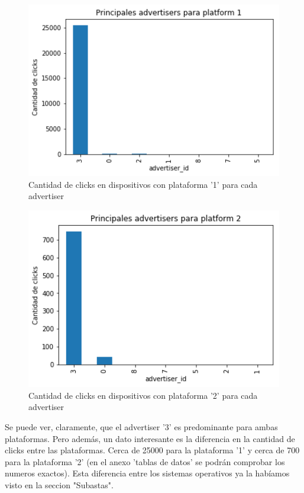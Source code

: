 \documentclass[a4paper, 12pt]{article}
\begin{document}
	\FloatBarrier
		\begin{figure}[h]
			\centering
			\includegraphics[width=350pt]{images/auctions-clicks/advporSO.png}
			\caption{Cantidad de clicks en dispositivos con plataforma '1' para cada advertiser}
			\label{advporSO}
		\end{figure}

		\begin{figure}[h]
			\centering
			\includegraphics[width=350pt]{images/auctions-clicks/advporSO2.png}
			\caption{Cantidad de clicks en dispositivos con plataforma '2' para cada advertiser}
			\label{advporSO2}
		\end{figure}
	\FloatBarrier

	 Se puede ver, claramente, que el advertiser '3' es predominante para ambas plataformas. Pero además, un dato interesante es la diferencia en la cantidad de clicks entre las plataformas. Cerca de 25000 para la plataforma '1' y cerca de 700 para la plataforma '2' (en el anexo 'tablas de datos' se podrán comprobar los numeros exactos). Esta diferencia entre los sistemas operativos ya la habíamos visto en la seccion "Subastas".
\end{document}
